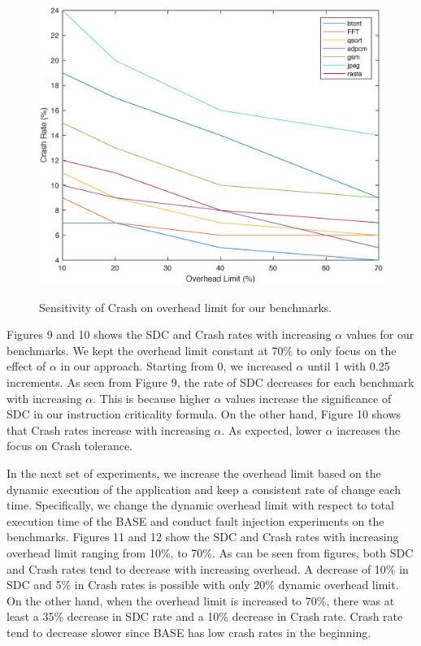 \begin{figure}[!t]
\begin{center}
{\label{fig:plan_16}\includegraphics[scale=0.32]{./figures/figure12.eps}}
\end{center}
\caption{Sensitivity of Crash on overhead limit for our benchmarks.}
\label{fig:plan_16}
\end{figure}



Figures 9 and 10 shows the SDC and Crash rates with increasing $\alpha$ values for our benchmarks. We kept the overhead limit constant at 70\% to only focus on the effect of $\alpha$ in our approach. Starting from 0, we increased $\alpha$ until 1 with 0.25 increments. As seen from Figure 9, the rate of SDC decreases for each benchmark with increasing $\alpha$. This is because higher $\alpha$ values increase the significance of SDC in our instruction criticality formula. On the other hand, Figure 10 shows that Crash rates increase with increasing $\alpha$. As expected, lower $\alpha$ increases the focus on Crash tolerance.  


In the next set of experiments, we increase the overhead limit based on the dynamic execution of the application and keep a consistent rate of change each time. Specifically, we change the dynamic overhead limit with respect to total execution time of the BASE and conduct fault injection experiments on the benchmarks. Figures 11 and 12 show the SDC and Crash rates with increasing overhead limit ranging from 10\%, to 70\%. As can be seen from figures, both SDC and Crash rates tend to decrease with increasing overhead. A decrease of 10\% in SDC and 5\% in Crash rates is possible with only 20\% dynamic overhead limit. On the other hand, when the overhead limit is increased to 70\%, there was at least a 35\% decrease in SDC rate and a 10\% decrease in Crash rate. Crash rate tend to decrease slower since BASE has low crash rates in the beginning. 


